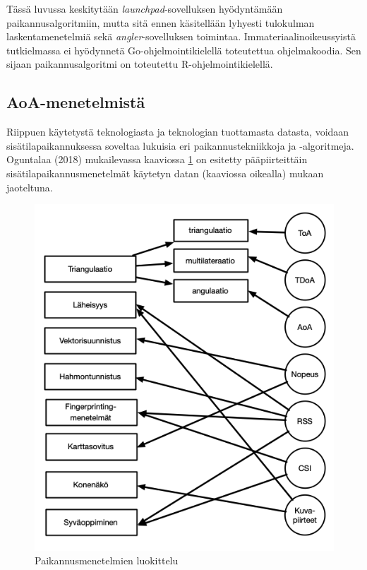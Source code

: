 \documentclass[
  12pt,
  a4paper, twoside]{book}
\begin{document}
Tässä luvussa keskitytään \emph{launchpad}-sovelluksen hyödyntämään paikannusalgoritmiin, mutta sitä ennen käsitellään lyhyesti tulokulman laskentamenetelmiä sekä \emph{angler}-sovelluksen toimintaa. Immateriaalinoikeussyistä tutkielmassa ei hyödynnetä Go-ohjelmointikielellä toteutettua ohjelmakoodia. Sen sijaan paikannusalgoritmi on toteutettu R-ohjelmointikielellä.

\subsection{AoA-menetelmistä} \label{aoa}

Riippuen käytetystä teknologiasta ja teknologian tuottamasta datasta, voidaan sisätilapaikannuksessa soveltaa lukuisia eri paikannustekniikkoja ja -algoritmeja. Oguntalaa (2018) \citep{oguntala-2018} mukailevassa kaaviossa \ref{fig:paikannusmenetelmat} on esitetty pääpiirteittäin sisätilapaikannusmenetelmät käytetyn datan (kaaviossa oikealla) mukaan jaoteltuna.

\begin{figure}[H]
\centering
\includegraphics[width=12.5cm]{paikannusmenetelmat}
\caption{Paikannusmenetelmien luokittelu}
\label{fig:paikannusmenetelmat}
\end{figure}
\end{document}
